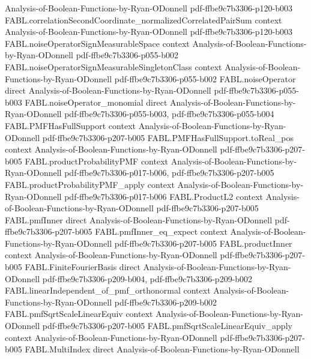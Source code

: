 \begin{theorem}
  {Analysis-of-Boolean-Functions-by-Ryan-ODonnell}
  {pdf-ffbe9c7b3306-p120-b003}
\proofstep
  {FABL.correlationSecondCoordinate_normalizedCorrelatedPairSum}
  {context}
  {Analysis-of-Boolean-Functions-by-Ryan-ODonnell}
  {pdf-ffbe9c7b3306-p120-b003}
\proofstep
  {FABL.noiseOperatorSignMeasurableSpace}
  {context}
  {Analysis-of-Boolean-Functions-by-Ryan-ODonnell}
  {pdf-ffbe9c7b3306-p055-b002}
\proofstep
  {FABL.noiseOperatorSignMeasurableSingletonClass}
  {context}
  {Analysis-of-Boolean-Functions-by-Ryan-ODonnell}
  {pdf-ffbe9c7b3306-p055-b002}
\proofstep
  {FABL.noiseOperator}
  {direct}
  {Analysis-of-Boolean-Functions-by-Ryan-ODonnell}
  {pdf-ffbe9c7b3306-p055-b003}
\proofstep
  {FABL.noiseOperator_monomial}
  {direct}
  {Analysis-of-Boolean-Functions-by-Ryan-ODonnell}
  {pdf-ffbe9c7b3306-p055-b003,
    pdf-ffbe9c7b3306-p055-b004}
\proofstep
  {FABL.PMFHasFullSupport}
  {context}
  {Analysis-of-Boolean-Functions-by-Ryan-ODonnell}
  {pdf-ffbe9c7b3306-p207-b005}
\proofstep
  {FABL.PMFHasFullSupport.toReal_pos}
  {context}
  {Analysis-of-Boolean-Functions-by-Ryan-ODonnell}
  {pdf-ffbe9c7b3306-p207-b005}
\proofstep
  {FABL.productProbabilityPMF}
  {context}
  {Analysis-of-Boolean-Functions-by-Ryan-ODonnell}
  {pdf-ffbe9c7b3306-p017-b006,
    pdf-ffbe9c7b3306-p207-b005}
\proofstep
  {FABL.productProbabilityPMF_apply}
  {context}
  {Analysis-of-Boolean-Functions-by-Ryan-ODonnell}
  {pdf-ffbe9c7b3306-p017-b006}
\proofstep
  {FABL.ProductL2}
  {context}
  {Analysis-of-Boolean-Functions-by-Ryan-ODonnell}
  {pdf-ffbe9c7b3306-p207-b005}
\proofstep
  {FABL.pmfInner}
  {direct}
  {Analysis-of-Boolean-Functions-by-Ryan-ODonnell}
  {pdf-ffbe9c7b3306-p207-b005}
\proofstep
  {FABL.pmfInner_eq_expect}
  {context}
  {Analysis-of-Boolean-Functions-by-Ryan-ODonnell}
  {pdf-ffbe9c7b3306-p207-b005}
\proofstep
  {FABL.productInner}
  {context}
  {Analysis-of-Boolean-Functions-by-Ryan-ODonnell}
  {pdf-ffbe9c7b3306-p207-b005}
\proofstep
  {FABL.FiniteFourierBasis}
  {direct}
  {Analysis-of-Boolean-Functions-by-Ryan-ODonnell}
  {pdf-ffbe9c7b3306-p209-b004,
    pdf-ffbe9c7b3306-p209-b002}
\proofstep
  {FABL.linearIndependent_of_pmf_orthonormal}
  {context}
  {Analysis-of-Boolean-Functions-by-Ryan-ODonnell}
  {pdf-ffbe9c7b3306-p209-b002}
\proofstep
  {FABL.pmfSqrtScaleLinearEquiv}
  {context}
  {Analysis-of-Boolean-Functions-by-Ryan-ODonnell}
  {pdf-ffbe9c7b3306-p207-b005}
\proofstep
  {FABL.pmfSqrtScaleLinearEquiv_apply}
  {context}
  {Analysis-of-Boolean-Functions-by-Ryan-ODonnell}
  {pdf-ffbe9c7b3306-p207-b005}
\proofstep
  {FABL.MultiIndex}
  {direct}
  {Analysis-of-Boolean-Functions-by-Ryan-ODonnell}

\end{theorem}
